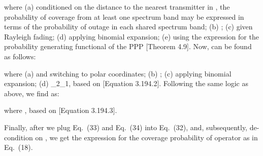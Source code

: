\documentclass[12pt, journal,doublecolumn, final]{IEEEtran}
\begin{document}
where (a) conditioned on the distance  to the nearest transmitter in , the probability of coverage from at least one spectrum band may be expressed in terms of the probability of outage in each shared spectrum band; (b) ; (c) given Rayleigh fading; (d) applying binomial expansion; (e) using the expression for the probability generating functional of the PPP \cite{Haenggi_2013}[Theorem 4.9]. Now,  can be found as follows:

where (a)  and switching to polar coordinates; (b) ; (c) applying binomial expansion; (d) _2_1, based on \cite{GradshteynRyzhik_2007}[Equation 3.194.2]. Following the same logic as above, we find  as:

where , based on \cite{GradshteynRyzhik_2007}[Equation 3.194.3].

Finally, after we plug Eq.~(33) and Eq.~(34) into Eq.~(32), and, subsequently, de-condition on , we get the expression for the coverage probability of operator  as in Eq.~(18).

\ifCLASSOPTIONcaptionsoff
  \newpage
\fi



\end{document}
